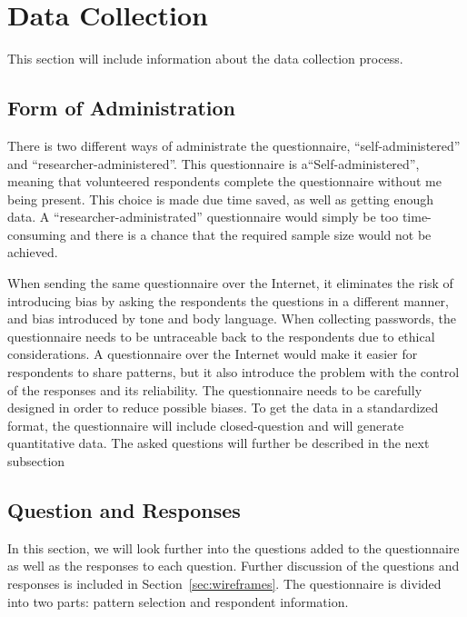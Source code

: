 \section{Data Collection} \label{sec:datacollection}
  
  This section will include information about the data collection process.

  \subsection{Form of Administration} \label{sec:formodadministration}

  There is two different ways of administrate the questionnaire, ``self-administered'' and ``researcher-administered''. This questionnaire is a``Self-administered'', meaning that volunteered respondents complete the questionnaire without me being present. This choice is made due time saved, as well as getting enough data. A ``researcher-administrated'' questionnaire would simply be too time-consuming and there is a chance that the required sample size would not be achieved. 
    
  When sending the same questionnaire over the Internet, it eliminates the risk of introducing bias by asking the respondents the questions in a different manner, and bias introduced by tone and body language. When collecting passwords, the questionnaire needs to be untraceable back to the respondents due to ethical considerations. A questionnaire over the Internet would make it easier for respondents to share patterns, but it also introduce the problem with the control of the responses and its reliability. The questionnaire needs to be carefully designed in order to reduce possible biases. To get the data in a standardized format, the questionnaire will include closed-question and will generate quantitative data. The asked questions will further be described in the next subsection

  \subsection{Question and Responses}\label{sec:questions}

  In this section, we will look further into the questions added to the questionnaire as well as the responses to each question. Further discussion of the questions and responses is included in Section~\ref{sec:wireframes}.
  The questionnaire is divided into two parts: pattern selection and respondent information. 


